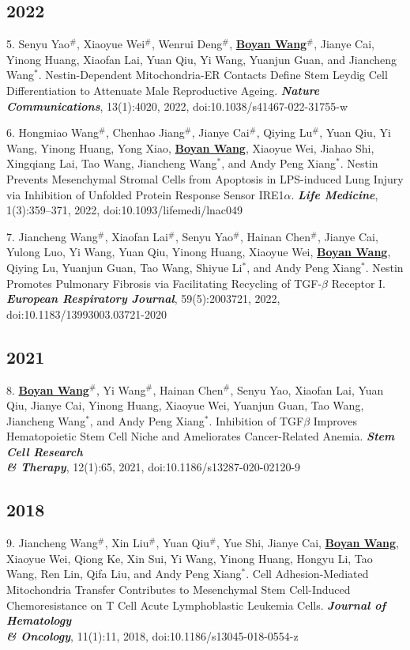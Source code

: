 \documentclass{article}
\begin{document}
\subsection*{2022}

5. Senyu Yao$^{\#}$, Xiaoyue Wei$^{\#}$, Wenrui Deng$^{\#}$, \underline{\textbf{Boyan Wang}}$^{\#}$, Jianye Cai, Yinong Huang, Xiaofan Lai, Yuan Qiu, Yi Wang, Yuanjun Guan, and Jiancheng Wang$^{*}$. Nestin-Dependent Mitochondria-ER Contacts Define Stem Leydig Cell Differentiation to Attenuate Male Reproductive Ageing. \textbf{\textit{Nature Communications}}, 13(1):4020, 2022, doi:10.1038/s41467-022-31755-w

6. Hongmiao Wang$^{\#}$, Chenhao Jiang$^{\#}$, Jianye Cai$^{\#}$, Qiying Lu$^{\#}$, Yuan Qiu, Yi Wang, Yinong Huang, Yong Xiao, \underline{\textbf{Boyan Wang}}, Xiaoyue Wei, Jiahao Shi, Xingqiang Lai, Tao Wang, Jiancheng Wang$^{*}$, and Andy Peng Xiang$^{*}$. Nestin Prevents Mesenchymal Stromal Cells from Apoptosis in LPS-induced Lung Injury via Inhibition of Unfolded Protein Response Sensor IRE1$\alpha$. \textbf{\textit{Life Medicine}}, 1(3):359–371, 2022, doi:10.1093/lifemedi/lnac049

7. Jiancheng Wang$^{\#}$, Xiaofan Lai$^{\#}$, Senyu Yao$^{\#}$, Hainan Chen$^{\#}$, Jianye Cai, Yulong Luo, Yi Wang, Yuan Qiu, Yinong Huang, Xiaoyue Wei, \underline{\textbf{Boyan Wang}}, Qiying Lu, Yuanjun Guan, Tao Wang, Shiyue Li$^{*}$, and Andy Peng Xiang$^{*}$. Nestin Promotes Pulmonary Fibrosis via Facilitating Recycling of TGF-$\beta$ Receptor I. \textbf{\textit{European Respiratory Journal}}, 59(5):2003721, 2022, doi:10.1183/13993003.03721-2020

\subsection*{2021}

8. \underline{\textbf{Boyan Wang}}$^{\#}$, Yi Wang$^{\#}$, Hainan Chen$^{\#}$, Senyu Yao, Xiaofan Lai, Yuan Qiu, Jianye Cai, Yinong Huang, Xiaoyue Wei, Yuanjun Guan, Tao Wang, Jiancheng Wang$^{*}$, and Andy Peng Xiang$^{*}$. Inhibition of TGF$\beta$ Improves Hematopoietic Stem Cell Niche and Ameliorates Cancer-Related Anemia. \textbf{\textit{Stem Cell Research \\& Therapy}}, 12(1):65, 2021, doi:10.1186/s13287-020-02120-9

\subsection*{2018}

9. Jiancheng Wang$^{\#}$, Xin Liu$^{\#}$, Yuan Qiu$^{\#}$, Yue Shi, Jianye Cai, \underline{\textbf{Boyan Wang}}, Xiaoyue Wei, Qiong Ke, Xin Sui, Yi Wang, Yinong Huang, Hongyu Li, Tao Wang, Ren Lin, Qifa Liu, and Andy Peng Xiang$^{*}$. Cell Adhesion-Mediated Mitochondria Transfer Contributes to Mesenchymal Stem Cell-Induced Chemoresistance on T Cell Acute Lymphoblastic Leukemia Cells. \textbf{\textit{Journal of Hematology \\& Oncology}}, 11(1):11, 2018, doi:10.1186/s13045-018-0554-z
\end{document}
